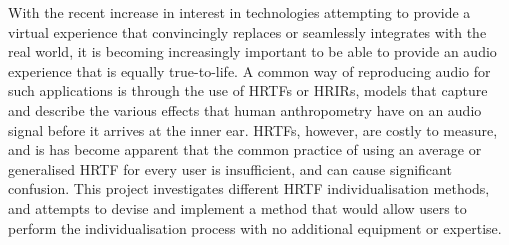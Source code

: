 With the recent increase in interest in technologies attempting to provide a virtual experience that convincingly replaces or seamlessly integrates with the real world, it is becoming increasingly important to be able to provide an audio experience that is equally true-to-life. A common way of reproducing audio for such applications is through the use of HRTFs or HRIRs, models that capture and describe the various effects that human anthropometry have on an audio signal before it arrives at the inner ear. HRTFs, however, are costly to measure, and is has become apparent that the common practice of using an average or generalised HRTF for every user is insufficient, and can cause significant confusion. This project investigates different HRTF individualisation methods, and attempts to devise and implement a method that would allow users to perform the individualisation process with no additional equipment or expertise. 
